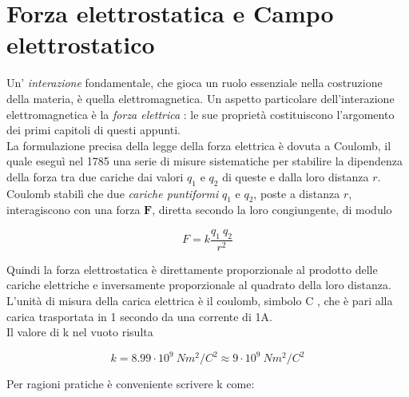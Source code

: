 \restoregeometry

\chapter{Forza elettrostatica e Campo elettrostatico}

Un' \emph{interazione} fondamentale, che gioca un ruolo essenziale nella costruzione della materia, è quella elettromagnetica. Un aspetto particolare dell'interazione elettromagnetica è la \emph{forza elettrica} : le sue proprietà costituiscono l'argomento dei primi capitoli di questi appunti. \\

La formulazione precisa della legge della forza elettrica è dovuta a Coulomb, il quale eseguì nel 1785 una serie di misure sistematiche per stabilire la dipendenza della forza tra due cariche dai valori $q_1$ e $q_2$ di queste e dalla loro distanza $r$.\\ 
 Coulomb stabilì che due \emph{cariche puntiformi} $q_1$ e $q_2$, poste a distanza $r$, interagiscono con una forza $\mathbf{F}$, diretta secondo la loro congiungente, di modulo 

\begin{tcolorbox}[colback=yellow!10!white, colframe=orange!70!black, boxrule=0.8pt]
\begin{equation}
    F = k \frac{q_1 \ q_2}{r^2}
\end{equation}
\end{tcolorbox}

Quindi la forza elettrostatica è direttamente proporzionale al prodotto delle cariche elettriche e inversamente proporzionale al quadrato della loro distanza. \\

L'unità di misura della carica elettrica è il coulomb, simbolo C , che è pari alla carica trasportata in 1 secondo da una corrente di 1A.\\

Il valore di k nel vuoto risulta 

\begin{equation}
    k = 8.99 \cdot 10^9 \ Nm^2/C^2 \approx 9 \cdot 10^9 \ Nm^2/C^2
\end{equation}

Per ragioni pratiche è conveniente scrivere k come:

